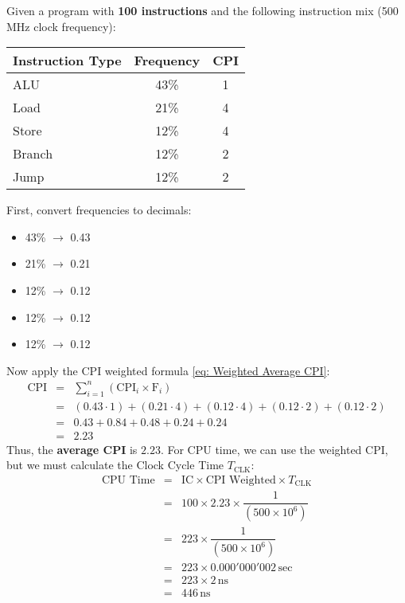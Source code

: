 \begin{examplebox}
  Given a program with \textbf{100 instructions} and the following instruction mix (500 MHz clock frequency):
  \begin{center}
    \begin{tabular}{@{} l c c @{}}
      \toprule
      Instruction Type & Frequency & CPI \\
      \midrule
      ALU       & 43\%  & 1 \\ [.3em]
      Load      & 21\%  & 4 \\ [.3em]
      Store     & 12\%  & 4 \\ [.3em]
      Branch    & 12\%  & 2 \\ [.3em]
      Jump      & 12\%  & 2 \\
      \bottomrule
    \end{tabular}
  \end{center}
  First, convert frequencies to decimals:
  \begin{itemize}
    \item 43\% $\rightarrow$ 0.43
    \item 21\% $\rightarrow$ 0.21
    \item 12\% $\rightarrow$ 0.12
    \item 12\% $\rightarrow$ 0.12
    \item 12\% $\rightarrow$ 0.12
  \end{itemize}
  Now apply the CPI weighted formula \ref{eq: Weighted Average CPI}:
  \begin{equation*}
    \begin{array}{rcl}
      \text{CPI} &=& \displaystyle\sum_{i=1}^{n} \left(\text{CPI}_{i} \times \text{F}_{i}\right) \\ [1.5em]
      &=& (0.43 \cdot 1) + (0.21 \cdot 4) + (0.12 \cdot 4) + (0.12 \cdot 2) + (0.12 \cdot 2) \\ [.6em]
      &=& 0.43 + 0.84 + 0.48 + 0.24 + 0.24 \\ [.3em]
      &=& 2.23
    \end{array}
  \end{equation*}
  Thus, the \textbf{average CPI} is $2.23$. For CPU time, we can use the weighted CPI, but we must calculate the Clock Cycle Time $T_{\text{CLK}}$:
  \begin{equation*}
    \begin{array}{rcl}
      \text{CPU Time} &=& \text{IC} \times \text{CPI Weighted} \times T_{\text{CLK}} \\ [1em]
      &=& 100 \times 2.23 \times \dfrac{1}{\left(500 \times 10^{6}\right)} \\ [1em]
      &=& 223 \times \dfrac{1}{\left(500 \times 10^{6}\right)} \\ [1.2em]
      &=& 223 \times 0.000'000'002\, \text{sec} \\ [.5em]
      &=& 223 \times 2\, \text{ns} \\ [.5em]
      &=& 446\, \text{ns}
    \end{array}
  \end{equation*}
\end{examplebox}


